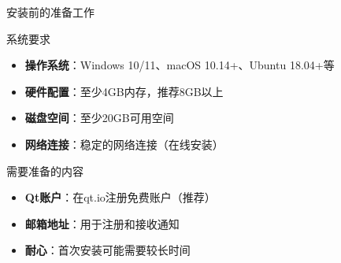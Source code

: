 \documentclass[UTF8,aspectratio=169]{beamer}
\begin{document}
\begin{frame}{安装前的准备工作}
    \begin{ytualertblock}{系统要求}
        \begin{itemize}
            \item \textbf{操作系统}：Windows 10/11、macOS 10.14+、Ubuntu 18.04+等
            \item \textbf{硬件配置}：至少4GB内存，推荐8GB以上
            \item \textbf{磁盘空间}：至少20GB可用空间
            \item \textbf{网络连接}：稳定的网络连接（在线安装）
        \end{itemize}
    \end{ytualertblock}

    \begin{ytualertblock}{需要准备的内容}
        \begin{itemize}
            \item \textbf{Qt账户}：在qt.io注册免费账户（推荐）
            \item \textbf{邮箱地址}：用于注册和接收通知
            \item \textbf{耐心}：首次安装可能需要较长时间
        \end{itemize}
    \end{ytualertblock}
\end{frame}
\end{document}
